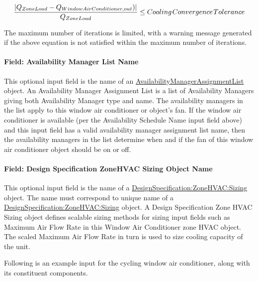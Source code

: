 \begin{equation}
\frac{{\left| {{Q_{ZoneLoad}} - {Q_{WindowAirConditioner,out}})} \right|}}{{{Q_{ZoneLoad}}}} \le Cooling{\kern 1pt} Convergence{\kern 1pt} Tolerance
\end{equation}

The maximum number of iterations is limited, with a warning message generated if the above equation is not satisfied within the maximum number of iterations.

\paragraph{Field: Availability Manager List Name}\label{field-availability-manager-list-name-5}

This optional input field is the name of an \hyperref[availabilitymanagerassignmentlist]{AvailabilityManagerAssignmentList} object. An Availability Manager Assignment List is a list of Availability Managers giving both Availability Manager type and name. The availability managers in the list apply to this window air conditioner or object's fan. If the window air conditioner is available (per the Availability Schedule Name input field above) and this input field has a valid availability manager assignment list name, then the availability managers in the list determine when and if the fan of this window air conditioner object should be on or off.

\paragraph{Field: Design Specification ZoneHVAC Sizing Object Name}\label{field-design-specification-zonehvac-sizing-object-name-5}

This optional input field is the name of a \hyperref[designspecificationzonehvacsizing]{DesignSpecification:ZoneHVAC:Sizing} object. The name must correspond to unique name of a \hyperref[designspecificationzonehvacsizing]{DesignSpecification:ZoneHVAC:Sizing} object. A Design Specification Zone HVAC Sizing object defines scalable sizing methods for sizing input fields such as Maximum Air Flow Rate in this Window Air Conditioner zone HVAC object. The scaled Maximum Air Flow Rate in turn is used to size cooling capacity of the unit.

Following is an example input for the cycling window air conditioner, along with its constituent components.

